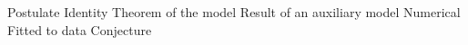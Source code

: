 %
\expandafter\def\csname claimlevel@A\endcsname{Postulate}
\expandafter\def\csname claimlevel@I\endcsname{Identity}
\expandafter\def\csname claimlevel@C\endcsname{Theorem of the model}
\expandafter\def\csname claimlevel@X\endcsname{Result of an auxiliary model}
\expandafter\def\csname claimlevel@N\endcsname{Numerical}
\expandafter\def\csname claimlevel@P\endcsname{Fitted to data}
\expandafter\def\csname claimlevel@S\endcsname{Conjecture}
\newcommand{\claimlevelname}[1]{%
  \ifcsname claimlevel@#1\endcsname\csname claimlevel@#1\endcsname\else#1\fi}
\newenvironment{keyresult}[2]%
  {\par\nobreak\vspace{-2pt}%
   {\raggedleft\scriptsize\sffamily\color{black!55}%
    #1 --- \claimlevelname{#1}\par}%
   \nobreak\vspace{-6pt}%
   \begin{equation}\label{#2}\begin{aligned}}%
  {\end{aligned}\end{equation}}

\newcommand{\TODO}[1]{\textcolor{red}{\textbf{[TODO: #1]}}}
\newcommand{\CITE}{\textcolor{orange}{\textbf{[CITE]}}}
